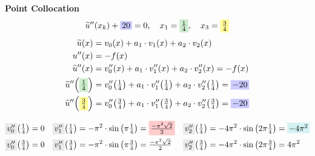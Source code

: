 \documentclass[
final,
a4paper,
oneside,
parskip=full,
headings=standardclasses,
headings=big,
pointednumbers,
fleqn
]{scrartcl}
\newcommand{\tfillb}[1]{\tfillc[#1][blue!20]}
\newcommand{\tfillg}[1]{\tfillc[#1][Green!20]}
\newcommand{\tfilly}[1]{\tfillc[#1][yellow!40]}
\newcommand{\tfillr}[1]{\tfillc[#1][red!20]}
\newcommand{\tfillt}[1]{\tfillc[#1][Turquoise!20]}
\newcommand{\tfillgr}[1]{\tfillc[#1][Gray!20]}
\newcommand{\fs}[2]{{\tfrac{#1}{#2}}}
\newcommand{\kl}[1]{{\left( #1 \right)}}
\begin{document}
    {\bf{Point Collocation}} \\
    {\setlength{\abovedisplayskip}{-6pt}
    \setlength{\belowdisplayskip}{-12pt}
    \begin{align*}
        \widetilde{u}''\kl{x_k} + \tfillb{$20$} = 0, \quad x_1 = \tfillg{$\fs{1}{4}$}, \quad x_3 = \tfilly{$\fs{3}{4}$}
    \end{align*}}
    {\setlength{\abovedisplayskip}{6pt}
    \setlength{\belowdisplayskip}{-12pt}
    \begin{align*}
        \widetilde{u}\kl{x}   &= v_0\kl{x}   + a_1 \cdot v_1\kl{x}   + a_2 \cdot v_2\kl{x} \\
        u''\kl{x} &= -f\kl{x} \\
        \widetilde{u}''\kl{x} &= v_0''\kl{x} + a_1 \cdot v_1''\kl{x} + a_2 \cdot v_2''\kl{x} = -f\kl{x} \\
        \widetilde{u}''\kl{\tfillg{$\fs{1}{4}$}} &= v_0''\kl{\fs{1}{4}} + a_1 \cdot v_1''\kl{\fs{1}{4}} + a_2 \cdot v_2''\kl{\fs{1}{4}} = \tfillb{$-20$} \\
        \widetilde{u}''\kl{\tfilly{$\fs{3}{4}$}} &= v_0''\kl{\fs{3}{4}} + a_1 \cdot v_1''\kl{\fs{3}{4}} + a_2 \cdot v_2''\kl{\fs{3}{4}} = \tfillb{$-20$} \\
    \end{align*}}
    \begin{minipage}{0.8\textwidth}
        \setlength{\abovedisplayskip}{-6pt}
        \setlength{\belowdisplayskip}{-12pt}
        \begin{align*}
        \tfillgr{$v_0''$}\kl{\fs{1}{4}} &= 0 &
        \tfillgr{$v_1''$}\kl{\fs{1}{4}} &= -\pi^2 \cdot \sin\kl{\pi \fs{1}{4}} = \tfillr{$\fs{-\pi^2 \sqrt{2}}{2}$} &
        \tfillgr{$v_2''$}\kl{\fs{1}{4}} &= -4 \pi^2 \cdot \sin\kl{2 \pi \fs{1}{4}} = \tfillt{$-4\pi^2$}\\
        \tfillgr{$v_0''$}\kl{\fs{3}{4}} &= 0 &
        \tfillgr{$v_1''$}\kl{\fs{3}{4}} &= -\pi^2 \cdot \sin\kl{\pi \fs{3}{4}} = \fs{-\pi^2 \sqrt{2}}{2} &
        \tfillgr{$v_2''$}\kl{\fs{3}{4}} &= -4 \pi^2 \cdot \sin\kl{2 \pi \fs{3}{4}} = 4\pi^2\\
        \end{align*}
    \end{minipage}
\end{document}
